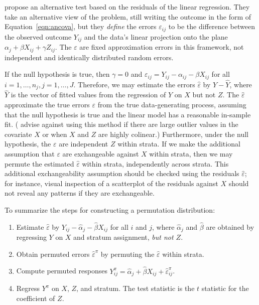 \documentclass[12pt]{article}
\newcommand{\todo}[1]{{\color{red}{TO DO: \sc #1}}}
\begin{document}
\citet{freedman_nonstochastic_1983} propose an alternative test based on the residuals of the linear regression.
They take an alternative view of the problem, still writing the outcome in the form of Equation~\ref{eqn:ancova}, but they \textit{define} the errors $\varepsilon_{ij}$ to be the difference between the observed outcome $Y_{ij}$ and the data's linear projection onto the plane $\alpha_j + \beta X_{ij}+ \gamma Z_{ij}$.
The $\varepsilon$ are fixed approximation errors in this framework, not independent and identically distributed random errors.

If the null hypothesis is true, then $\gamma = 0$ and $\varepsilon_{ij} = Y_{ij} - \alpha_{ij} - \beta X_{ij}$ for all $i = 1, \dots, n_j, j = 1, \dots, J$.
Therefore, we may estimate the errors $\hat{\varepsilon}$ by $Y - \hat{Y}$, where $\hat{Y}$ is the vector of fitted values from the regression of $Y$ on $X$ but not $Z$.
The $\hat{\varepsilon}$ approximate the true errors $\varepsilon$ from the true data-generating process, assuming that the null hypothesis is true and the linear model has a reasonable in-sample fit.
(\cite{freedman_nonstochastic_1983} advise against using this method if there are large outlier values in the covariate $X$ or when $X$ and $Z$ are highly colinear.)
\todo{not clear how to formally test the conditions for the permutation test. visual inspection is not satisfactory}
Furthermore, under the null hypothesis, the $\varepsilon$ are independent $Z$ within strata. 
If we make the additional assumption that $\varepsilon$ are exchangeable against $X$ within strata, then 
we may permute the estimated $\hat{\varepsilon}$ within strata, independently across strata.
This additional exchangeability assumption should be checked using the residuals $\hat{\varepsilon}$;
for instance, visual inspection of a scatterplot of the residuals against $X$ should not reveal any patterns if they are exchangeable.

To summarize the steps for constructing a permutation distribution:

\begin{enumerate}
\item Estimate $\hat{\varepsilon}$ by $Y_{ij} - \hat{\alpha}_j - \hat{\beta} X_{ij}$ for all $i$ and $j$, where $\hat{\alpha}_j$ and $\hat{\beta}$ are obtained by regressing $Y$ on $X$ and stratum assignment, \textit{but not $Z$}.
\item Obtain permuted errors $\hat{\varepsilon}^\pi$ by permuting the $\hat{\varepsilon}$ within strata.
\item Compute permuted responses $Y_{ij}^\pi = \hat{\alpha}_j + \hat{\beta} X_{ij}+ \hat{\varepsilon}_{ij}^\pi$.
\item Regress $Y^\pi$ on $X$, $Z$, and stratum. The test statistic is the $t$ statistic for the coefficient of $Z$.
\end{enumerate}
\end{document}
